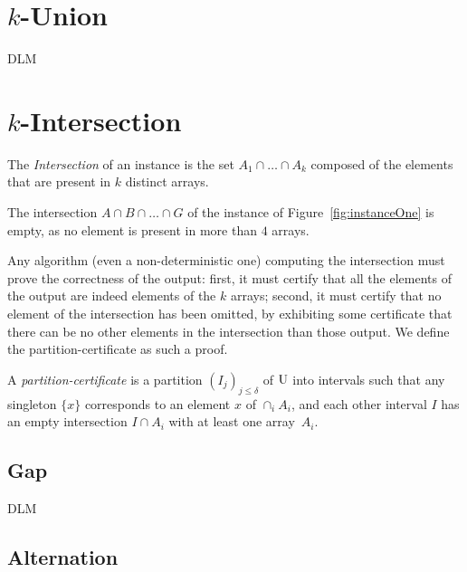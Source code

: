 \section{$k$-Union}
\label{sec:k-union}

DLM\cite{dlm}

\section{$k$-Intersection}
\label{sec:k-intersection}

\begin{definition}
The {\em Intersection} of an instance is the set
$A_1\cap\ldots\cap A_k$ composed of the elements that are present in
$k$ distinct arrays.
\end{definition}
\begin{example}
The intersection $A\cap B\cap\ldots\cap G$ of the instance of
Figure~\ref{fig:instanceOne} is empty, as no element is present in
more than $4$ arrays.
\end{example}

Any algorithm (even a non-deterministic one) computing the
intersection must prove the correctness of the output: first, it must
certify that all the elements of the output are indeed elements of the
$k$ arrays; second, it must certify that no element of the
intersection has been omitted, by exhibiting some certificate that
there can be no other elements in the intersection than those output.
%
We define the partition-certificate as such a proof.
%
\begin{definition}
A {\em partition-certificate} is a partition $(I_j)_{j\leq\delta}$ of
$\rm U$ into intervals such that any singleton $\{x\}$ corresponds to
an element $x$ of $\cap_i A_i$, and each other interval $I$ has an
empty intersection $I\cap A_i$ with at least one array~$A_i$.
\end{definition}


\subsection{Gap}
\label{sec:gap}

DLM\cite{dlm}

\subsection{Alternation~\cite{alternationAndRedundancyAnalysisOfTheIntersectionProblem}}
\label{sec:alternation}





